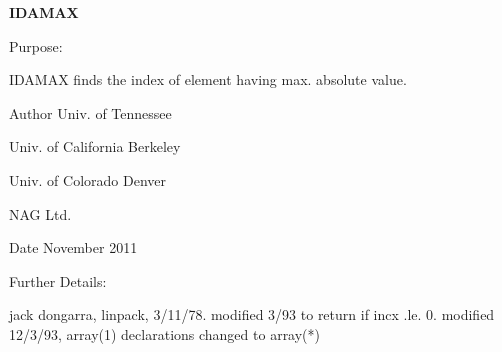 {\bfseries I\+D\+A\+M\+A\+X} 

\begin{DoxyParagraph}{Purpose\+: }
\begin{DoxyVerb}    IDAMAX finds the index of element having max. absolute value.\end{DoxyVerb}
 
\end{DoxyParagraph}
\begin{DoxyAuthor}{Author}
Univ. of Tennessee 

Univ. of California Berkeley 

Univ. of Colorado Denver 

N\+A\+G Ltd. 
\end{DoxyAuthor}
\begin{DoxyDate}{Date}
November 2011 
\end{DoxyDate}
\begin{DoxyParagraph}{Further Details\+: }
\begin{DoxyVerb}     jack dongarra, linpack, 3/11/78.
     modified 3/93 to return if incx .le. 0.
     modified 12/3/93, array(1) declarations changed to array(*)\end{DoxyVerb}
 
\end{DoxyParagraph}

